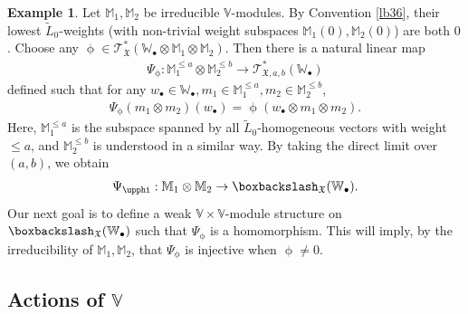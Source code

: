 \documentclass[12pt,b5paper,notitlepage]{report}
\theoremstyle{definition}
\newtheorem{eg}[df]{Example}
\theoremstyle{plain}
\newcommand{\fk}{\mathfrak}
\newcommand{\wtd}{\widetilde}
\newcommand{\scr}{\mathscr}
\newcommand{\blt}{\bullet}
\newcommand{\Vbb}{\mathbb V}
\newcommand{\Wbb}{\mathbb W}
\newcommand{\Mbb}{\mathbb M}
\numberwithin{equation}{section}
\begin{document}
\begin{eg}\label{lb112}
Let $\Mbb_1,\Mbb_2$ be irreducible $\Vbb$-modules. By Convention \ref{lb36},  their lowest $\wtd L_0$-weights  (with non-trivial weight subspaces $\Mbb_1(0),\Mbb_2(0)$) are both $0$. Choose any $\upphi\in\scr T_{\fk X}^*(\Wbb_\blt\otimes\Mbb_1\otimes\Mbb_2)$. Then there is a natural linear map
\begin{gather*}
\Psi_\upphi:\Mbb_1^{\leq a}\otimes\Mbb_2^{\leq b}\rightarrow\scr T_{\fk X,a,b}^*(\Wbb_\blt)
\end{gather*}
defined such that for any $w_\blt\in\Wbb_\blt,m_1\in\Mbb_1^{\leq a},m_2\in\Mbb_2^{\leq b}$,
\begin{gather}
\Psi_\upphi(m_1\otimes m_2)(w_\blt)=\upphi(w_\blt\otimes m_1\otimes m_2).\label{eq216}
\end{gather}
Here, $\Mbb_1^{\leq a}$ is the subspace spanned by all $\wtd L_0$-homogeneous vectors with weight $\leq a$, and $\Mbb_2^{\leq b}$ is understood in a similar way. By taking the direct limit over $(a,b)$, we obtain
\begin{gather*}
\Psi_\upphi:\Mbb_1\otimes\Mbb_2\rightarrow \boxbackslash_{\fk X}(\Wbb_\blt).
\end{gather*}
Our next goal is to define a weak $\Vbb\times\Vbb$-module structure on $\boxbackslash_{\fk X}(\Wbb_\blt)$ such that $\Psi_\upphi$ is a homomorphism. This will imply, by the irreducibility of $\Mbb_1,\Mbb_2$, that $\Psi_\upphi$ is injective when $\upphi\neq 0$.
\end{eg}

\subsection*{Actions of $\Vbb$}
\end{document}
